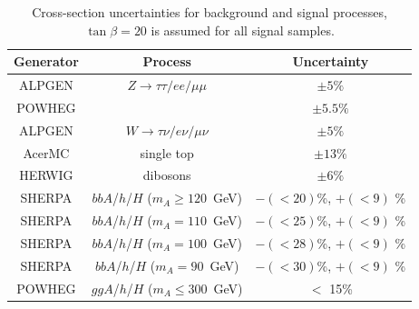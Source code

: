 \begin{table} [t]
\centering
\begin{tabular}{c c c }
\hline
\hline
Generator & Process & Uncertainty \\ [0.5ex]
\hline
ALPGEN & $Z \rightarrow \tau\tau / ee /\mu\mu$ & $\pm 5\%$ \\
POWHEG & \ttbar					& $\pm 5.5\%$\\
ALPGEN & $W  \rightarrow \tau\nu / e\nu /\mu\nu$&  $\pm  5\%$ \\
AcerMC & single top & $\pm 13 \%$ \\
HERWIG & dibosons & $\pm 6 \%$ \\
SHERPA & $bbA$/$h$/$H$  ($m_{A} \ge 120$~GeV)     & $-(<20)$\%,  $+(<9)$ \%\\
SHERPA & $bbA$/$h$/$H$  ($m_{A} =   110$~GeV)     & $-(<25)$\%,  $+(<9)$ \%\\
SHERPA & $bbA$/$h$/$H$  ($m_{A} =   100$~GeV)     & $-(<28)$\%,  $+(<9)$ \%\\
SHERPA & $bbA$/$h$/$H$  ($m_{A} =    90$~GeV)     & $-(<30)$\%,  $+(<9)$ \%\\
POWHEG & $ggA$/$h$/$H$  ($m_{A} \le 300$~GeV)     & $<$ 15\%\\  [0.5ex]
\hline \hline 
\end{tabular}
\caption{Cross-section uncertainties for background and signal processes, $\tan\beta = 20$ is assumed for all signal samples.}
\label{table:sys_xsec}
\end{table}


